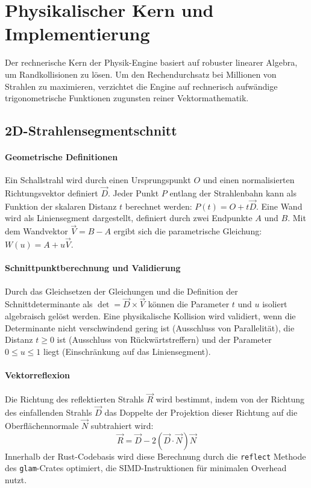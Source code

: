 
\section{Physikalischer Kern und Implementierung}
\label{sec:implementierung}

Der rechnerische Kern der Physik-Engine basiert auf robuster linearer Algebra, um Randkollisionen zu lösen. Um den Rechendurchsatz bei Millionen von Strahlen zu maximieren, verzichtet die Engine auf rechnerisch aufwändige trigonometrische Funktionen zugunsten reiner Vektormathematik.

\subsection{2D-Strahlensegmentschnitt}
\label{subsec:2d_schnitt}

\paragraph{Geometrische Definitionen}
Ein Schallstrahl wird durch einen Ursprungspunkt $O$ und einen normalisierten Richtungsvektor definiert $\vec{D}$. Jeder Punkt $P$ entlang der Strahlenbahn kann als Funktion der skalaren Distanz $t$ berechnet werden: $P(t) = O + t\vec{D}$.
Eine Wand wird als Liniensegment dargestellt, definiert durch zwei Endpunkte $A$ und $B$. Mit dem Wandvektor $\vec{V} = B - A$ ergibt sich die parametrische Gleichung: $W(u) = A + u\vec{V}$.

\paragraph{Schnittpunktberechnung und Validierung}
Durch das Gleichsetzen der Gleichungen und die Definition der Schnittdeterminante als $\det = \vec{D} \times \vec{V}$ können die Parameter $t$ und $u$ isoliert algebraisch gelöst werden.
Eine physikalische Kollision wird validiert, wenn die Determinante nicht verschwindend gering ist (Ausschluss von Parallelität), die Distanz $t \ge 0$ ist (Ausschluss von Rückwärtstreffern) und der Parameter $0 \le u \le 1$ liegt (Einschränkung auf das Liniensegment).

\paragraph{Vektorreflexion}
Die Richtung des reflektierten Strahls $\vec{R}$ wird bestimmt, indem von der Richtung des einfallenden Strahls $\vec{D}$ das Doppelte der Projektion dieser Richtung auf die Oberflächennormale $\vec{N}$ subtrahiert wird:
\[\vec{R} = \vec{D} - 2(\vec{D} \cdot \vec{N})\vec{N}\]
Innerhalb der Rust-Codebasis wird diese Berechnung durch die \texttt{reflect} Methode des \texttt{glam}-Crates optimiert, die SIMD-Instruktionen für minimalen Overhead nutzt.


